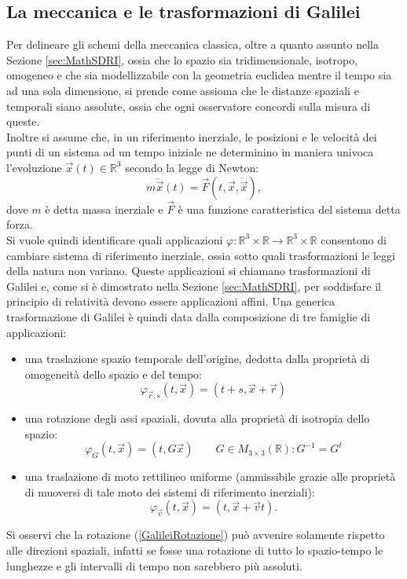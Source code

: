 \subsection{La meccanica e le trasformazioni di Galilei}\label{sec:MC}
Per delineare gli schemi della meccanica classica, oltre a quanto assunto nella Sezione \ref{sec:MathSDRI}, ossia che lo spazio sia tridimensionale, isotropo, omogeneo e che sia modellizzabile con la geometria euclidea mentre il tempo sia ad una sola dimensione, si prende come assioma che le distanze spaziali e temporali siano assolute, ossia che ogni osservatore concordi sulla misura di queste.\\
Inoltre si assume che, in un riferimento inerziale, le posizioni e le velocità dei punti di un sistema ad un tempo iniziale ne determinino in maniera univoca l'evoluzione $\vec x(t)\in \mathbb{R}^3$ secondo la legge di Newton:
\begin{equation}
	m\ddot{\vec{x}}(t)=\vec{F}(t,\vec{x},\dot{\vec{x}}),
	\label{equazioneDiNewton}
\end{equation}
dove $m$ è detta massa inerziale e $\vec{F}$ è una funzione caratteristica del sistema detta forza.\\

Si vuole quindi identificare quali applicazioni $\varphi:\mathbb{R}^3\times\mathbb{R}\rightarrow
\mathbb{R}^3\times\mathbb{R}$ consentono di cambiare sistema di riferimento inerziale, ossia sotto quali 
trasformazioni le leggi della natura non variano. Queste applicazioni si chiamano trasformazioni di 
Galilei e, come si è dimostrato nella Sezione \ref{sec:MathSDRI}, per soddisfare il principio di relatività devono essere applicazioni affini.
Una generica trasformazione di Galilei è quindi data dalla composizione di tre famiglie di applicazioni:
\begin{itemize}
	\item una traslazione spazio temporale dell'origine, dedotta dalla proprietà 
	di omogeneità dello spazio e del tempo:
	\begin{equation}
		\varphi_{\vec{r},s}(t,\vec{x})=(t+s,\vec{x}+\vec{r})
		\label{GalileiTraslazoine}
	\end{equation} 
\item una rotazione degli assi spaziali, dovuta alla proprietà di isotropia dello spazio:
\begin{equation}
	\varphi_{G}(t,\vec{x})=(t,G\vec{x}) \qquad G\in M_{3\times3}(\mathbb{R}):G^{-1}=G^t
	\label{GalileiRotazione}
\end{equation} 
	\item una traslazione di moto rettilineo uniforme (ammissibile grazie alle proprietà di muoversi di tale moto dei sistemi 
	di riferimento inerziali):
\begin{equation}
	\varphi_{\vec{v}}(t,\vec{x})=(t,\vec{x}+\vec{v}t).
	\label{GalileiVelocità}
\end{equation} 
\end{itemize}
Si osservi che la rotazione (\ref{GalileiRotazione}) può avvenire solamente rispetto alle direzioni spaziali, infatti se fosse una rotazione di tutto lo spazio-tempo le lunghezze e gli intervalli di tempo non sarebbero più assoluti.\\

